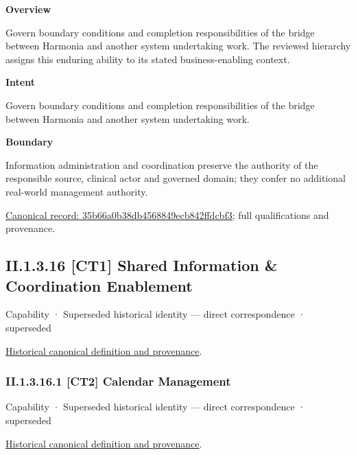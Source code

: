 \textbf{Overview}



Govern boundary conditions and completion responsibilities of the bridge between Harmonia and another system undertaking work. The reviewed hierarchy assigns this enduring ability to its stated business-enabling context.



\textbf{Intent}



Govern boundary conditions and completion responsibilities of the bridge between Harmonia and another system undertaking work.



\textbf{Boundary}



Information administration and coordination preserve the authority of the responsible source, clinical actor and governed domain; they confer no additional real-world management authority.


{\footnotesize \href{../../../../continuum/strategy/capability/35b66a0b38db4568849ecb842ffdcbf3.md}{Canonical record: 35b66a0b38db4568849ecb842ffdcbf3}; full qualifications and provenance.}\par
\subsection*{II.1.3.16 [CT1] Shared Information \& Coordination Enablement}
\label{navigation:II.1.3.16}

\label{element:eeabb9c3c526404cbe4302906560fa7e}
{\small Capability · Superseded historical identity — direct correspondence · superseded}\par
\href{../../../../continuum/strategy/capability/eeabb9c3c526404cbe4302906560fa7e.md}{Historical canonical definition and provenance}.\par
\subsubsection*{II.1.3.16.1 [CT2] Calendar Management}
\label{navigation:II.1.3.16.1}

\label{element:8b42aac6083441caa78b59f5e62eebd9}
{\small Capability · Superseded historical identity — direct correspondence · superseded}\par
\href{../../../../continuum/strategy/capability/8b42aac6083441caa78b59f5e62eebd9.md}{Historical canonical definition and provenance}.\par
